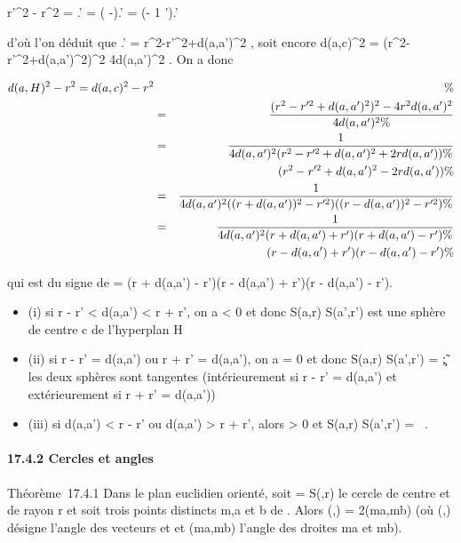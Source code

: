 \documentclass[]{article}
\begin{document}
 r'^2 - r^2  =
\overlinebc.\overlineaa' =
(\overlineac
-\overlineab).\overlineaa' =
(\overlineac - 1 
\overlineaa').\overlineaa'

d'où l'on déduit que
\overlineac.\overlineaa' =
r^2-r'^2+d(a,a')^2  , soit encore d(a,c)^2 =
(r^2-r'^2+d(a,a')^2)^2
\over 4d(a,a')^2 . On a donc

\begin{align*} d(a,H)^2 - r^2
= d(a,c)^2 - r^2&& \%&
\\ & =& (r^2 -
r'^2 + d(a,a')^2)^2 -
4r^2d(a,a')^2 \over
4d(a,a')^2 \%& \\ & =& 1
\over 4d(a,a')^2 (r^2 -
r'^2 + d(a,a')^2 + 2rd(a,a')) \%&
\\ & & \quad
(r^2 - r'^2 + d(a,a')^2 - 2rd(a,a'))
\%& \\ & =& 1 \over
4d(a,a')^2 ((r + d(a,a'))^2 -
r'^2)((r - d(a,a'))^2 - r'^2)\%&
\\ & =& 1 \over
4d(a,a')^2 (r + d(a,a') + r')(r + d(a,a') - r') \%&
\\ & & \quad (r - d(a,a')
+ r')(r - d(a,a') - r') \%& \\
\end{align*}

qui est du signe de \delta = (r + d(a,a') - r')(r - d(a,a') + r')(r - d(a,a')
- r').

\begin{itemize}
\itemsep1pt\parskip0pt
\item
  (i) si r - r' < d(a,a') < r +
  r', on a \delta < 0 et donc S(a,r) \bigcap S(a',r') est une sphère de
  centre c de l'hyperplan H
\item
  (ii) si r - r' = d(a,a') ou r + r' = d(a,a'), on a
  \delta = 0 et donc S(a,r) \bigcap S(a',r') =
  \c\~; les deux sphères sont
  tangentes (intérieurement si r - r' = d(a,a') et
  extérieurement si r + r' = d(a,a'))
\item
  (iii) si d(a,a') < r - r' ou d(a,a')
  > r + r', alors \delta > 0 et S(a,r) \bigcap S(a',r') =
  \varnothing~.
\end{itemize}

\paragraph{17.4.2 Cercles et angles}

Théorème~17.4.1 Dans le plan euclidien orienté, soit \Gamma = S(\omega,r) le
cercle de centre \omega et de rayon r et soit trois points distincts m,a et b
de \Gamma. Alors
\widehat(\overrightarrow\omegaa,\overrightarrow\omegab)
= 2\widehat(ma,mb) (où
\widehat(\overrightarrow\omegaa,\overrightarrow\omegab)
désigne l'angle des vecteurs \overrightarrow\omegaa et
\overrightarrow\omegab et
\widehat(ma,mb) l'angle des droites ma et mb).
\end{document}
